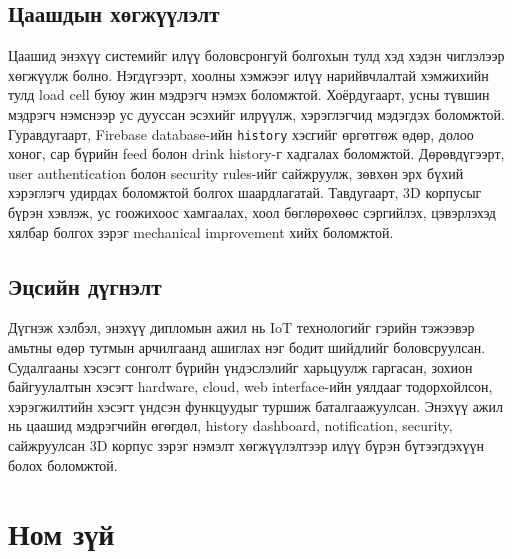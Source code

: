 \documentclass[12pt,a4paper]{report}
\begin{document}
\section{Цаашдын хөгжүүлэлт}

Цаашид энэхүү системийг илүү боловсронгуй болгохын тулд хэд хэдэн чиглэлээр хөгжүүлж болно. Нэгдүгээрт, хоолны хэмжээг илүү нарийвчлалтай хэмжихийн тулд load cell буюу жин мэдрэгч нэмэх боломжтой. Хоёрдугаарт, усны түвшин мэдрэгч нэмснээр ус дууссан эсэхийг илрүүлж, хэрэглэгчид мэдэгдэх боломжтой. Гуравдугаарт, Firebase database-ийн \texttt{history} хэсгийг өргөтгөж өдөр, долоо хоног, сар бүрийн feed болон drink history-г хадгалах боломжтой. Дөрөвдүгээрт, user authentication болон security rules-ийг сайжруулж, зөвхөн эрх бүхий хэрэглэгч удирдах боломжтой болгох шаардлагатай. Тавдугаарт, 3D корпусыг бүрэн хэвлэж, ус гоожихоос хамгаалах, хоол бөглөрөхөөс сэргийлэх, цэвэрлэхэд хялбар болгох зэрэг mechanical improvement хийх боломжтой.

\section{Эцсийн дүгнэлт}

Дүгнэж хэлбэл, энэхүү дипломын ажил нь IoT технологийг гэрийн тэжээвэр амьтны өдөр тутмын арчилгаанд ашиглах нэг бодит шийдлийг боловсруулсан. Судалгааны хэсэгт сонголт бүрийн үндэслэлийг харьцуулж гаргасан, зохион байгуулалтын хэсэгт hardware, cloud, web interface-ийн уялдааг тодорхойлсон, хэрэгжилтийн хэсэгт үндсэн функцуудыг туршиж баталгаажуулсан. Энэхүү ажил нь цаашид мэдрэгчийн өгөгдөл, history dashboard, notification, security, сайжруулсан 3D корпус зэрэг нэмэлт хөгжүүлэлтээр илүү бүрэн бүтээгдэхүүн болох боломжтой.

\newpage
{}
\chapter*{Ном зүй}
\end{document}

